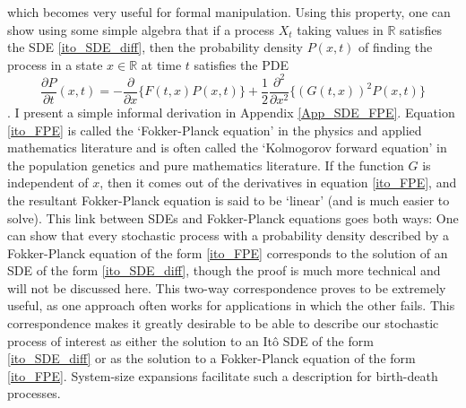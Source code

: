 which becomes very useful for formal manipulation. Using this property, one can show using some simple algebra that if a process $X_t$ taking values in $\mathbb{R}$ satisfies the SDE \eqref{ito_SDE_diff}, then the probability density $P(x,t)$ of finding the process in a state $x \in \mathbb{R}$ at time $t$ satisfies the PDE
\begin{equation}
\label{ito_FPE}
\frac{\partial P}{\partial t}(x,t) = -\frac{\partial}{\partial x}\{F(t,x)P(x,t)\} + \frac{1}{2}\frac{\partial^2}{\partial x^2}\{(G(t,x))^2P(x,t)\}
\end{equation}
. I present a simple informal derivation in Appendix \ref{App_SDE_FPE}. Equation \eqref{ito_FPE} is called the `Fokker-Planck equation' in the physics and applied mathematics literature \citep{gardiner_stochastic_2009} and is often called the `Kolmogorov forward equation' in the population genetics \citep{ewens_mathematical_2004} and pure mathematics \citep{oksendal_stochastic_1998} literature. If the function $G$ is independent of $x$, then it comes out of the derivatives in equation \eqref{ito_FPE}, and the resultant Fokker-Planck equation is said to be `linear' (and is much easier to solve). This link between SDEs and Fokker-Planck equations goes both ways: One can show that every stochastic process with a probability density described by a Fokker-Planck equation of the form \eqref{ito_FPE} corresponds to the solution of an SDE of the form \eqref{ito_SDE_diff}, though the proof is much more technical and will not be discussed here. This two-way correspondence proves to be extremely useful, as one approach often works for applications in which the other fails. This correspondence makes it greatly desirable to be able to describe our stochastic process of interest as either the solution to an It\^o SDE of the form \eqref{ito_SDE_diff} or as the solution to a Fokker-Planck equation of the form \eqref{ito_FPE}. System-size expansions facilitate such a description for birth-death processes.

